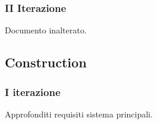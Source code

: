 \documentclass[10pt]{softeng} %
\begin{document}
\subsubsection{II Iterazione}

Documento inalterato.

\subsection{Construction}

\subsubsection{I iterazione}

Approfonditi requisiti sistema principali.


\printcustombib{}
\end{document}
